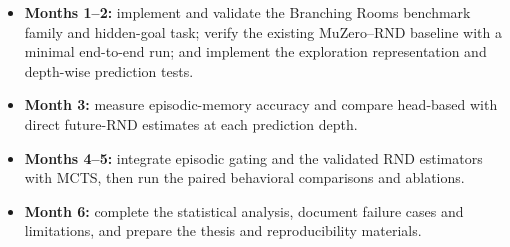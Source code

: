 \documentclass{article}
\begin{document}
\begin{itemize}
    \item \textbf{Months 1--2:} implement and validate the Branching Rooms
    benchmark family and hidden-goal task; verify the existing MuZero--RND
    baseline with a minimal end-to-end run; and implement the exploration
    representation and depth-wise prediction tests.

    \item \textbf{Month 3:} measure episodic-memory accuracy and compare
    head-based with direct future-RND estimates at each prediction depth.

    \item \textbf{Months 4--5:} integrate episodic gating and the validated RND
    estimators with MCTS, then run the paired behavioral comparisons and
    ablations.

    \item \textbf{Month 6:} complete the statistical analysis, document
    failure cases and limitations, and prepare the thesis and reproducibility
    materials.
\end{itemize}
\end{document}
